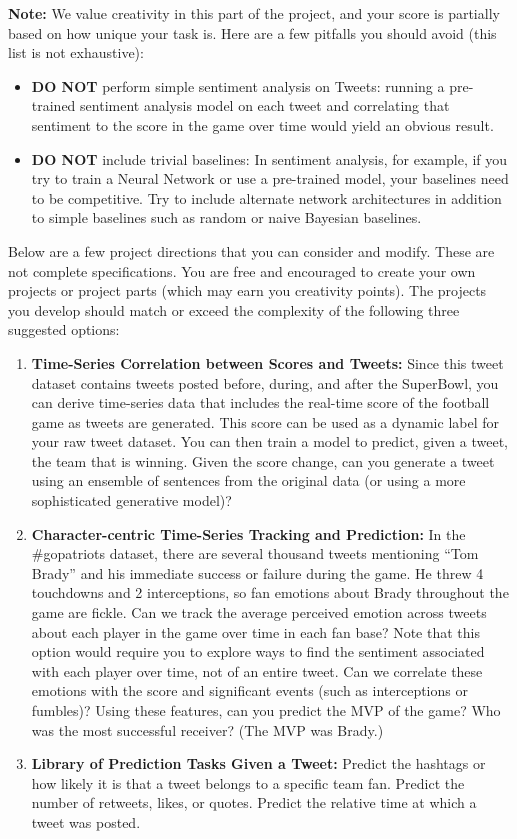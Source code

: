 \documentclass[12pt]{article}
\begin{document}
\textbf{Note:} We value creativity in this part of the project, and your score is partially based on how unique your task is. Here are a few pitfalls you should avoid (this list is not exhaustive):
\begin{itemize}
    \item \textbf{DO NOT} perform simple sentiment analysis on Tweets: running a pre-trained sentiment analysis model on each tweet and correlating that sentiment to the score in the game over time would yield an obvious result.
    \item \textbf{DO NOT} include trivial baselines: In sentiment analysis, for example, if you try to train a Neural Network or use a pre-trained model, your baselines need to be competitive. Try to include alternate network architectures in addition to simple baselines such as random or naive Bayesian baselines.
\end{itemize}

Below are a few project directions that you can consider and modify. These are not complete specifications. You are free and encouraged to create your own projects or project parts (which may earn you creativity points). The projects you develop should match or exceed the complexity of the following three suggested options:
\begin{enumerate}
    \item \textbf{Time-Series Correlation between Scores and Tweets:} Since this tweet dataset contains tweets posted before, during, and after the SuperBowl, you can derive time-series data that includes the real-time score of the football game as tweets are generated. This score can be used as a dynamic label for your raw tweet dataset. You can then train a model to predict, given a tweet, the team that is winning. Given the score change, can you generate a tweet using an ensemble of sentences from the original data (or using a more sophisticated generative model)?
    \item \textbf{Character-centric Time-Series Tracking and Prediction:} In the \#gopatriots dataset, there are several thousand tweets mentioning ``Tom Brady'' and his immediate success or failure during the game. He threw 4 touchdowns and 2 interceptions, so fan emotions about Brady throughout the game are fickle. Can we track the average perceived emotion across tweets about each player in the game over time in each fan base? Note that this option would require you to explore ways to find the sentiment associated with each player over time, not of an entire tweet. Can we correlate these emotions with the score and significant events (such as interceptions or fumbles)? Using these features, can you predict the MVP of the game? Who was the most successful receiver? (The MVP was Brady.)
    \item \textbf{Library of Prediction Tasks Given a Tweet:} Predict the hashtags or how likely it is that a tweet belongs to a specific team fan. Predict the number of retweets, likes, or quotes. Predict the relative time at which a tweet was posted.
\end{enumerate}
\end{document}
